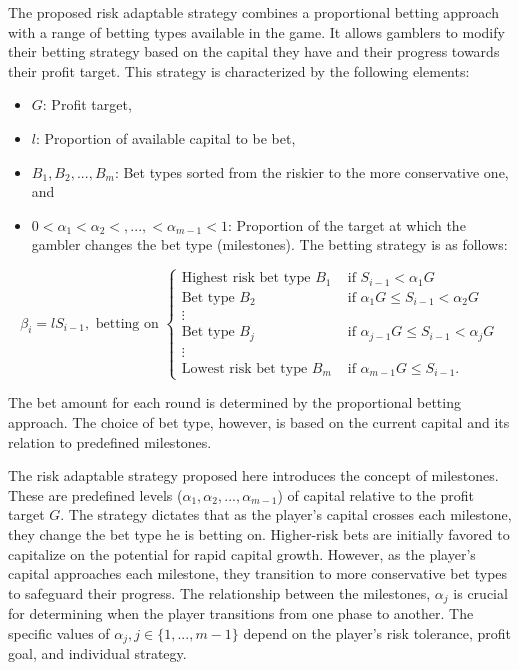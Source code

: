 \documentclass[11pt,twoside]{article}
\numberwithin{Theorem}{section}
\numberwithin{Definition}{section}
\numberwithin{Lemma}{section}
\numberwithin{Algorithm}{section}
\numberwithin{equation}{section}
\begin{document}
The proposed risk adaptable strategy combines a proportional betting approach with a range of betting types available in the game. It allows gamblers to modify their betting strategy based on the capital they have and their progress towards their profit target. This strategy is characterized by the following elements:
\begin{itemize}
    \item $G$: Profit target,
    \item $l$: Proportion of available capital to be bet,
    \item $B_{1}, B_{2}, ..., B_{m}$: Bet types sorted from the riskier to the more conservative one, and
    \item $0 <\alpha_{1}< \alpha_{2}<,...,<\alpha_{m-1}<1$: Proportion of the target at which the gambler changes the bet type (milestones).
The betting strategy is as follows:    
\end{itemize}
\begin{equation}
\beta_{i} = lS_{i-1}, \text{ betting on }\left\{
\begin{array}{ll}
\text{Highest risk bet type }B_{1}  & \text{ if }S_{i-1} < \alpha_{1}G\\
\text{Bet type }B_{2} & \text{ if } \alpha_{1}G \leq S_{i-1} < \alpha_{2}G\\
\vdots & \\
\text{Bet type }B_{j} & \text{ if } \alpha_{j-1}G \leq S_{i-1} < \alpha_{j}G\\
\vdots & \\
\text{Lowest risk bet type } B_{m} & \text{ if }\alpha_{m-1}G \leq  S_{i-1}.
\end{array}
\right.
\end{equation}

The bet amount for each round is determined by the proportional betting approach. The choice of bet type, however, is based on the current capital and its relation to predefined milestones. 

The risk adaptable strategy proposed here introduces the concept of milestones. These are predefined levels ($\alpha_{1}, \alpha_{2},...,\alpha_{m-1}$) of capital relative to the profit target $G$. The strategy dictates that as the player's capital crosses each milestone, they change the bet type he is betting on. Higher-risk bets are initially favored to capitalize on the potential for rapid capital growth. However, as the player's capital approaches each milestone, they transition to more conservative bet types to safeguard their progress. The relationship between the milestones, $\alpha_{j}$ is crucial for determining when the player transitions from one phase to another. The specific values of $\alpha_{j}, j \in \{1,...,m-1\}$ depend on the player's risk tolerance, profit goal, and individual strategy.
\end{document}
